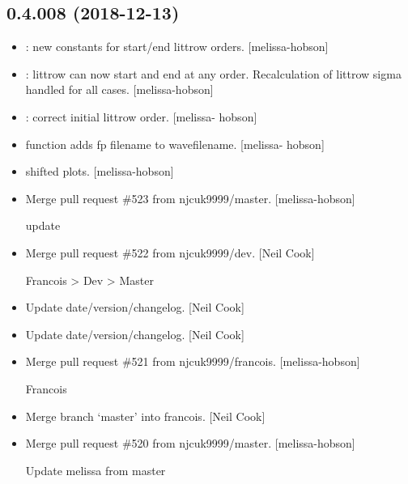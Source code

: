 \documentclass[a4paper,10pt,english]{report}
\begin{document}
\subsection{0.4.008 (2018-12-13)}
\label{\detokenize{misc/changelog:id236}}\begin{itemize}
\item {} 
: new constants for start/end littrow orders.
{[}melissa-hobson{]}

\item {} 
: littrow can now start and end at any order.
Recalculation of littrow sigma handled for all cases. {[}melissa-hobson{]}

\item {} 
: correct initial littrow order. {[}melissa-
hobson{]}

\item {} 
 function adds fp filename to wavefilename. {[}melissa-
hobson{]}

\item {} 
 shifted plots. {[}melissa-hobson{]}

\item {} 
Merge pull request \#523 from njcuk9999/master. {[}melissa-hobson{]}

update

\item {} 
Merge pull request \#522 from njcuk9999/dev. {[}Neil Cook{]}

Francois \textendash{}\textgreater{} Dev \textendash{}\textgreater{} Master

\item {} 
Update date/version/changelog. {[}Neil Cook{]}

\item {} 
Update date/version/changelog. {[}Neil Cook{]}

\item {} 
Merge pull request \#521 from njcuk9999/francois. {[}melissa-hobson{]}

Francois

\item {} 
Merge branch ‘master’ into francois. {[}Neil Cook{]}

\item {} 
Merge pull request \#520 from njcuk9999/master. {[}melissa-hobson{]}

Update melissa from master

\end{itemize}
\end{document}
